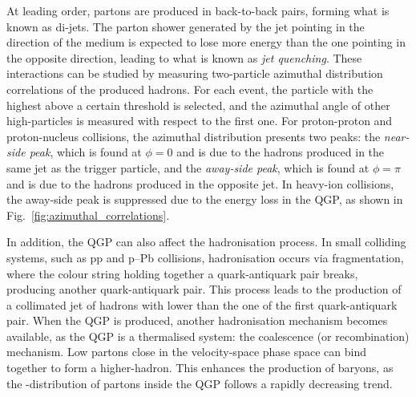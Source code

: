 At leading order, partons are produced in back-to-back pairs, forming what is known as di-jets. The parton shower generated by the jet pointing in the direction of the medium is expected to lose more energy than the one pointing in the opposite direction, leading to what is known as \emph{jet quenching}. These interactions can be studied by measuring two-particle azimuthal distribution correlations of the produced hadrons. For each event, the particle with the highest \pt above a certain threshold is selected, and the azimuthal angle of other high-\pt particles is measured with respect to the first one. For proton-proton and proton-nucleus collisions, the azimuthal distribution presents two peaks: the \emph{near-side peak}, which is found at $\phi=0$ and is due to the hadrons produced in the same jet as the trigger particle, and the \emph{away-side peak}, which is found at $\phi=\pi$ and is due to the hadrons produced in the opposite jet. In heavy-ion collisions, the away-side peak is suppressed due to the energy loss in the QGP, as shown in Fig.~\ref{fig:azimuthal_correlations}.

In addition, the QGP can also affect the hadronisation process. In small colliding systems, such as pp and p--Pb collisions, hadronisation occurs via fragmentation, where the colour string holding together a quark-antiquark pair breaks, producing another quark-antiquark pair. This process leads to the production of a collimated jet of hadrons with \pt lower than the one of the first quark-antiquark pair. When the QGP is produced, another hadronisation mechanism becomes available, as the QGP is a thermalised system: the coalescence (or recombination) mechanism. Low \pt partons close in the velocity-space phase space can bind together to form a higher-\pt hadron. This enhances the production of baryons, as the \pt-distribution of partons inside the QGP follows a rapidly decreasing trend.

